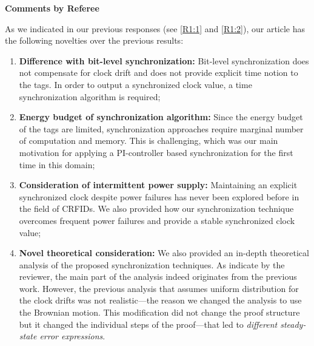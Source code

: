 \documentclass[10pt]{article}
\newcommand{\response}[1]{{\color{blue} #1}}
\newcounter{refereeCounter}
\newenvironment{responses}{%
\refstepcounter{refereeCounter}%
\textbf{\large Comments by Referee \therefereeCounter}
\begin{enumerate}%
\renewcommand{\labelenumi}{\textbf{[R\therefereeCounter :\,\arabic{enumi}]}} %
}{\end{enumerate}}
\begin{document}
\begin{responses}
\response{As we indicated in our previous responses (see \hyperref[R1:1]{[R1:1]} and \hyperref[R1:2]{[R1:2]}), our article has the following novelties over the previous results:
\begin{enumerate}
	\item \textbf{Difference with bit-level synchronization:} Bit-level synchronization does not compensate for clock drift and does not provide explicit time notion to the tags. In order to output a synchronized clock value, a time synchronization algorithm is required;
	\item \textbf{Energy budget of synchronization algorithm:} Since the energy budget of the tags are limited, synchronization approaches require marginal number of computation and memory. This is challenging, which was our main motivation for applying a PI-controller based synchronization for the first time in this domain;
	\item \textbf{Consideration of intermittent power supply:} Maintaining an explicit synchronized clock despite power failures has never been explored before in the field of CRFIDs. We also provided how our synchronization technique overcomes frequent power failures and provide a stable synchronized clock value;
	\item \textbf{Novel theoretical consideration:} We also provided an in-depth theoretical analysis of the proposed synchronization techniques. As indicate by the reviewer, the main part of the analysis indeed originates from the previous work. However, the previous analysis that assumes uniform distribution for the clock drifts was not realistic---the reason we changed the analysis to use the Brownian motion. This modification did not change the proof structure but it changed the individual steps of the proof---that led to \emph{different steady-state error expressions}.
\end{enumerate}}

\end{responses}
\end{document}
